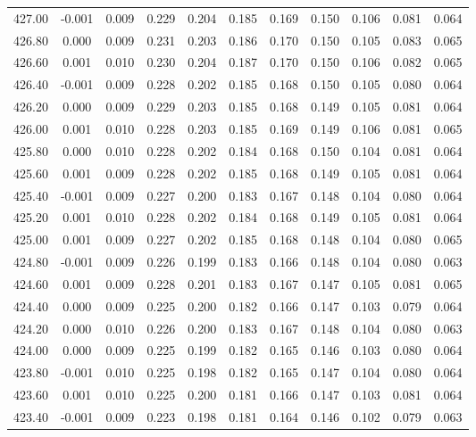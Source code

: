 \begin{longtable}{cccccccccc}
    427.00 & -0.001 &  0.009 &  0.229 &  0.204 &  0.185 &  0.169 &  0.150 &  0.106 &  0.081 &  0.064 \\
    426.80 &  0.000 &  0.009 &  0.231 &  0.203 &  0.186 &  0.170 &  0.150 &  0.105 &  0.083 &  0.065 \\
    426.60 &  0.001 &  0.010 &  0.230 &  0.204 &  0.187 &  0.170 &  0.150 &  0.106 &  0.082 &  0.065 \\
    426.40 & -0.001 &  0.009 &  0.228 &  0.202 &  0.185 &  0.168 &  0.150 &  0.105 &  0.080 &  0.064 \\
    426.20 &  0.000 &  0.009 &  0.229 &  0.203 &  0.185 &  0.168 &  0.149 &  0.105 &  0.081 &  0.064 \\
    426.00 &  0.001 &  0.010 &  0.228 &  0.203 &  0.185 &  0.169 &  0.149 &  0.106 &  0.081 &  0.065 \\
    425.80 &  0.000 &  0.010 &  0.228 &  0.202 &  0.184 &  0.168 &  0.150 &  0.104 &  0.081 &  0.064 \\
    425.60 &  0.001 &  0.009 &  0.228 &  0.202 &  0.185 &  0.168 &  0.149 &  0.105 &  0.081 &  0.064 \\
    425.40 & -0.001 &  0.009 &  0.227 &  0.200 &  0.183 &  0.167 &  0.148 &  0.104 &  0.080 &  0.064 \\
    425.20 &  0.001 &  0.010 &  0.228 &  0.202 &  0.184 &  0.168 &  0.149 &  0.105 &  0.081 &  0.064 \\
    425.00 &  0.001 &  0.009 &  0.227 &  0.202 &  0.185 &  0.168 &  0.148 &  0.104 &  0.080 &  0.065 \\
    424.80 & -0.001 &  0.009 &  0.226 &  0.199 &  0.183 &  0.166 &  0.148 &  0.104 &  0.080 &  0.063 \\
    424.60 &  0.001 &  0.009 &  0.228 &  0.201 &  0.183 &  0.167 &  0.147 &  0.105 &  0.081 &  0.065 \\
    424.40 &  0.000 &  0.009 &  0.225 &  0.200 &  0.182 &  0.166 &  0.147 &  0.103 &  0.079 &  0.064 \\
    424.20 &  0.000 &  0.010 &  0.226 &  0.200 &  0.183 &  0.167 &  0.148 &  0.104 &  0.080 &  0.063 \\
    424.00 &  0.000 &  0.009 &  0.225 &  0.199 &  0.182 &  0.165 &  0.146 &  0.103 &  0.080 &  0.064 \\
    423.80 & -0.001 &  0.010 &  0.225 &  0.198 &  0.182 &  0.165 &  0.147 &  0.104 &  0.080 &  0.064 \\
    423.60 &  0.001 &  0.010 &  0.225 &  0.200 &  0.181 &  0.166 &  0.147 &  0.103 &  0.081 &  0.064 \\
    423.40 & -0.001 &  0.009 &  0.223 &  0.198 &  0.181 &  0.164 &  0.146 &  0.102 &  0.079 &  0.063 \\

\end{longtable}

